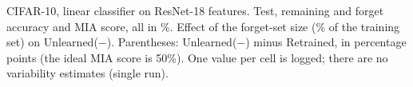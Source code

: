\begin{table}[t]
  \centering
  
  \caption{CIFAR-10, linear classifier on ResNet-18 features. Test, remaining and forget accuracy and MIA score, all in \%. Effect of the forget-set size (\% of the training set) on Unlearned($-$). Parentheses: Unlearned($-$) minus Retrained, in percentage points (the ideal MIA score is 50\%). One value per cell is logged; there are no variability estimates (single run).}
  \label{tab:forget_size}
\end{table}
